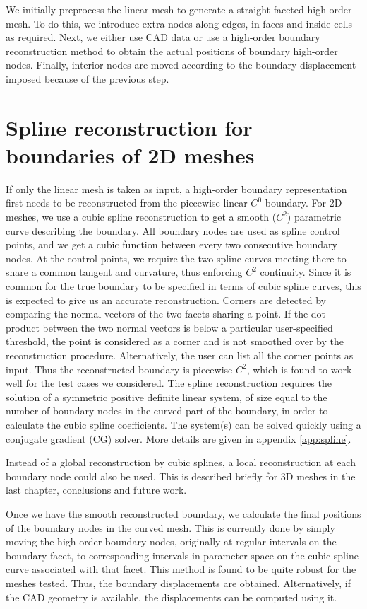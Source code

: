 We initially preprocess the linear mesh to generate a straight-faceted high-order mesh. To do this, we introduce extra nodes along edges, in faces and inside cells as required. Next, we either use CAD data or use a high-order boundary reconstruction method to obtain the actual positions of boundary high-order nodes. Finally, interior nodes are moved according to the boundary displacement imposed because of the previous step.

\section{Spline reconstruction for boundaries of 2D meshes}
\label{subsec:spline2d}
If only the linear mesh is taken as input, a high-order boundary representation first needs to be reconstructed from the piecewise linear $C^0$ boundary. For 2D meshes, we use a cubic spline reconstruction to get a smooth ($C^2$) parametric curve describing the boundary. All boundary nodes are used as spline control points, and we get a cubic function between every two consecutive boundary nodes. At the control points, we require the two spline curves meeting there to share a common tangent and curvature, thus enforcing $C^2$ continuity. Since it is common for the true boundary to be specified in terms of cubic spline curves, this is expected to give us an accurate reconstruction. Corners are detected by comparing the normal vectors of the two facets sharing a point. If the dot product between the two normal vectors is below a particular user-specified threshold, the point is considered as a corner and is not smoothed over by the reconstruction procedure. Alternatively, the user can list all the corner points as input. Thus the reconstructed boundary is piecewise $C^2$, which is found to work well for the test cases we considered. The spline reconstruction requires the solution of a symmetric positive definite linear system, of size equal to the number of boundary nodes in the curved part of the boundary, in order to calculate the cubic spline coefficients. The system(s) can be solved quickly using a conjugate gradient (CG) solver. More details are given in appendix \ref{app:spline}.

Instead of a global reconstruction by cubic splines, a local reconstruction at each boundary node could also be used. This is described briefly for 3D meshes in the last chapter, conclusions and future work.

Once we have the smooth reconstructed boundary, we calculate the final positions of the boundary nodes in the curved mesh. This is currently done by simply moving the high-order boundary nodes, originally at regular intervals on the boundary facet, to corresponding intervals in parameter space on the cubic spline curve associated with that facet. This method is found to be quite robust for the meshes tested. Thus, the boundary displacements are obtained. Alternatively, if the CAD geometry is available, the displacements can be computed using it.

